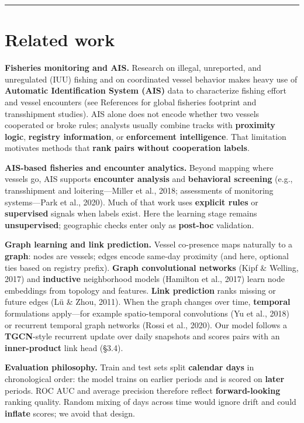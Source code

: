 \documentclass[
]{article}
\begin{document}
\begin{center}\rule{0.5\linewidth}{0.5pt}\end{center}

\section{Related work}\label{related-work}

\textbf{Fisheries monitoring and AIS.} Research on illegal, unreported,
and unregulated (IUU) fishing and on coordinated vessel behavior makes
heavy use of \textbf{Automatic Identification System (AIS)} data to
characterize fishing effort and vessel encounters (see References for
global fisheries footprint and transshipment studies). AIS alone does
not encode whether two vessels cooperated or broke rules; analysts
usually combine tracks with \textbf{proximity logic}, \textbf{registry
information}, or \textbf{enforcement intelligence}. That limitation
motivates methods that \textbf{rank pairs without cooperation labels}.

\textbf{AIS-based fisheries and encounter analytics.} Beyond mapping
where vessels go, AIS supports \textbf{encounter analysis} and
\textbf{behavioral screening} (e.g., transshipment and
loitering---Miller et al., 2018; assessments of monitoring
systems---Park et al., 2020). Much of that work uses \textbf{explicit
rules} or \textbf{supervised} signals when labels exist. Here the
learning stage remains \textbf{unsupervised}; geographic checks enter
only as \textbf{post-hoc} validation.

\textbf{Graph learning and link prediction.} Vessel co-presence maps
naturally to a \textbf{graph}: nodes are vessels; edges encode same-day
proximity (and here, optional ties based on registry prefix).
\textbf{Graph convolutional networks} (Kipf \& Welling, 2017) and
\textbf{inductive} neighborhood models (Hamilton et al., 2017) learn
node embeddings from topology and features. \textbf{Link prediction}
ranks missing or future edges (Lü \& Zhou, 2011). When the graph changes
over time, \textbf{temporal} formulations apply---for example
spatio-temporal convolutions (Yu et al., 2018) or recurrent temporal
graph networks (Rossi et al., 2020). Our model follows a
\textbf{TGCN}-style recurrent update over daily snapshots and scores
pairs with an \textbf{inner-product} link head (§3.4).

\textbf{Evaluation philosophy.} Train and test sets split
\textbf{calendar days} in chronological order: the model trains on
earlier periods and is scored on \textbf{later} periods. ROC AUC and
average precision therefore reflect \textbf{forward-looking} ranking
quality. Random mixing of days across time would ignore drift and could
\textbf{inflate} scores; we avoid that design.
\end{document}
